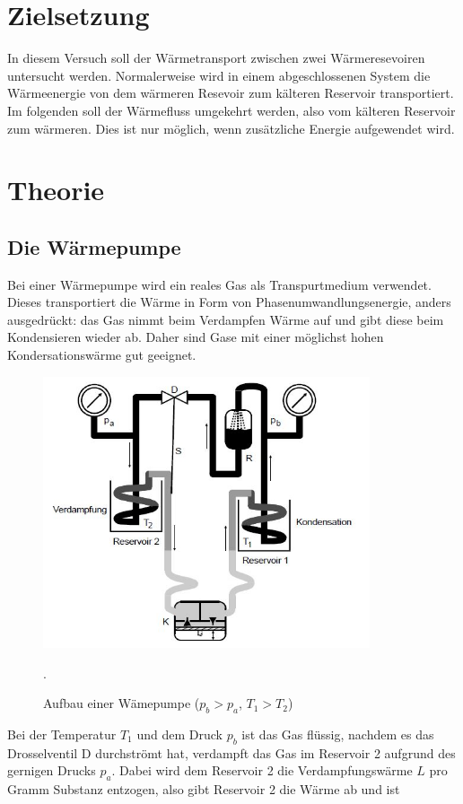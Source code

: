 
\section{Zielsetzung}
In diesem Versuch soll der Wärmetransport zwischen zwei Wärmeresevoiren untersucht werden.
Normalerweise wird in einem abgeschlossenen System die Wärmeenergie von dem wärmeren Resevoir zum
kälteren Reservoir transportiert. Im folgenden soll der Wärmefluss umgekehrt werden, also vom
kälteren Reservoir zum wärmeren. Dies ist nur möglich, wenn zusätzliche Energie
aufgewendet wird.

\section{Theorie}
\subsection{Die Wärmepumpe}
Bei einer Wärmepumpe wird ein reales Gas als Transpurtmedium verwendet. Dieses transportiert die
Wärme in Form von Phasenumwandlungsenergie, anders ausgedrückt: das Gas nimmt beim
Verdampfen Wärme auf und gibt diese beim Kondensieren wieder ab.
Daher sind Gase mit einer möglichst hohen Kondersationswärme gut geeignet.
\begin{figure}[H]
  \centering
  \includegraphics[height=8cm]{Pumpe.JPG}
  \caption{Aufbau einer Wämepumpe ($p_{b}>p_{a}$, $T_{1}>T_{2}$)}
  \cite{skript}.
  \label{fig:pumpe}
\end{figure}
Bei der Temperatur $T_{1}$ und dem Druck $p_{b}$ ist das Gas flüssig, nachdem es das Drosselventil D durchströmt
hat, verdampft das Gas im Reservoir 2 aufgrund des gernigen Drucks $p_{a}$. Dabei wird dem
Reservoir 2 die Verdampfungswärme $L$ pro Gramm Substanz entzogen, also gibt Reservoir 2 die Wärme ab und ist
